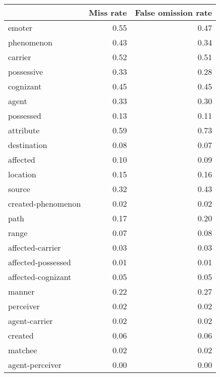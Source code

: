 \begin{table}[!ht]
\centering
\begin{tabular}{lrr}
\toprule
{} &  Miss rate &  False omission rate \\
\midrule
emoter               &       0.55 &                 0.47 \\
phenomenon           &       0.43 &                 0.34 \\
carrier              &       0.52 &                 0.51 \\
possessive           &       0.33 &                 0.28 \\
cognizant            &       0.45 &                 0.45 \\
agent                &       0.33 &                 0.30 \\
possessed            &       0.13 &                 0.11 \\
attribute            &       0.59 &                 0.73 \\
destination          &       0.08 &                 0.07 \\
affected             &       0.10 &                 0.09 \\
location             &       0.15 &                 0.16 \\
source               &       0.32 &                 0.43 \\
created-phenomenon   &       0.02 &                 0.02 \\
path                 &       0.17 &                 0.20 \\
range                &       0.07 &                 0.08 \\
affected-carrier     &       0.03 &                 0.03 \\
affected-possessed   &       0.01 &                 0.01 \\
affected-cognizant   &       0.05 &                 0.05 \\
manner               &       0.22 &                 0.27 \\
perceiver            &       0.02 &                 0.02 \\
agent-carrier        &       0.02 &                 0.02 \\
created              &       0.06 &                 0.06 \\
matchee              &       0.02 &                 0.02 \\
agent-perceiver      &       0.00 &                 0.00 \\

\end{tabular}
\end{table}
